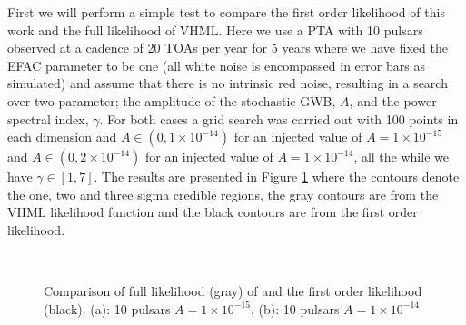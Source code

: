 \documentclass[iop]{emulateapj} \usepackage{apjfonts}
\begin{document}
First we will perform a simple test to compare the first order
likelihood of this work and the full likelihood of VHML. Here we use a
PTA with 10 pulsars observed at a cadence of 20 TOAs per year for 5 years
 where we have fixed the EFAC parameter to be one
(all white noise is encompassed in error bars as simulated) and assume
that there is no intrinsic red noise, resulting in a search over two
parameter; the amplitude of the stochastic GWB, $A$, and the power
spectral index, $\gamma$. For both cases a grid search was carried out
with 100 points in each dimension and $A\in (0,1\times 10^{-14})$ for
an injected value of $A=1\times 10^{-15}$ and $A\in (0,2\times
10^{-14})$ for an injected value of $A=1\times 10^{-14}$, all the
while we have $\gamma \in [1,7]$. The results are presented in Figure
\ref{fig:compare} where the contours denote the one, two and three
sigma credible regions, the gray contours are from the VHML likelihood
function and the black contours are from the first order likelihood.
\begin{figure}[t]
  \begin{center}
  \\
   \end{center}
  \caption{Comparison of full likelihood (gray) of \citet{hlm+09} and
the first order likelihood (black). (a): 10 pulsars $A=1\times
10^{-15}$, (b): 10 pulsars $A=1\times 10^{-14}$ } \label{fig:compare}
\end{figure}
\end{document}
